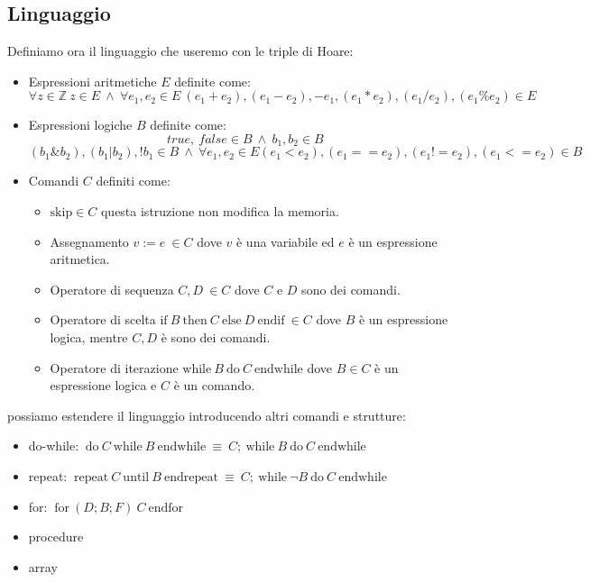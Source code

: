 \subsection{Linguaggio}
Definiamo ora il linguaggio che useremo con le triple di Hoare:
\begin{itemize}
    \item Espressioni aritmetiche $E$ definite come:
          \begin{equation}
              \forall z \in \mathbb{Z} \ z \in E \ \land \ \forall e_1, e_2 \in E \ (e_1 + e_2), (e_1 - e_2), -e_1, (e_1 \ast e_2), (e_1 / e_2), (e_1 \% e_2) \in E
          \end{equation}
    \item Espressioni logiche $B$ definite come:
        \begin{equation} 
            true, \ false \in B \ \land \ b_1,b_2\in B
        \end{equation}
        \begin{equation}
            (b_1\&b_2),(b_1| b_2), !b_1\in B \ \land \ \forall e_1,e_2\in E (e_1<e_2),(e_1==e_2),(e_1!= e_2 ), (e_1<=e_2)\in B
        \end{equation}
    \item Comandi $C$ definiti come:
    \begin{itemize}
        \item $\text{skip} \in C$ questa istruzione non modifica la memoria.
        \item Assegnamento $v := e \ \in C$ dove $v$ è una variabile ed $e$
                è un espressione aritmetica.
        \item Operatore di sequenza $C, D \ \in C $ dove $C$ e $D$ sono dei
            comandi.
        \item Operatore di scelta $\text{if} \ B \ \text{then} \ C \ \text{else} \ D \ \text{endif} \ \in C$
            dove $B$ è un espressione logica, mentre $C, D$ è sono dei comandi.
        \item Operatore di iterazione $\text{while} \ B \ \text{do} \ C \ \text{endwhile}$
            dove $B \in C$ è un espressione logica e $C$ è un comando.
    \end{itemize}
\end{itemize}
possiamo estendere il linguaggio introducendo altri comandi e strutture:
\begin{itemize}
    \item do-while: $\ \text{do} \ C \ \text{while} \ B \ \text{endwhile} \ \equiv \ C; \ \text{while} \ B \ \text{do} \ C \ \text{endwhile}$
	\item repeat: $ \ \text{repeat} \ C \ \text{until} \ B \ \text{endrepeat} \ \equiv \ C; \ \text{while} \ \lnot B \ \text{do} \ C \ \text{endwhile} $
	\item for: $ \ \text{for} \ (D;B;F) \ C \ \text{endfor}$
	\item procedure
	\item array
\end{itemize}
